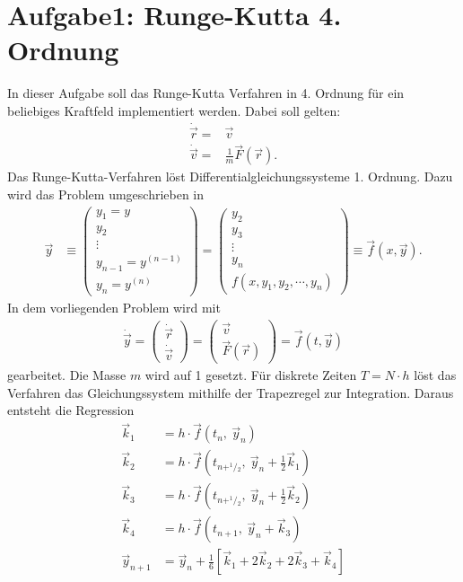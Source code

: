 
\section*{Aufgabe1: Runge-Kutta 4. Ordnung}
In dieser Aufgabe soll das Runge-Kutta Verfahren in 4. Ordnung
für ein beliebiges Kraftfeld implementiert werden.
Dabei soll gelten:
\begin{align}
	\dot{\vec{r}}=&\vec{v}\\
	\dot{\vec{v}}=&\frac{1}{m}\vec{F}(\vec{r}).
\end{align}
Das Runge-Kutta-Verfahren löst Differentialgleichungssysteme 1. Ordnung. Dazu wird das Problem umgeschrieben in
\begin{align}
	\vec{y}&\equiv
	\begin{pmatrix}
	y_1=y\\ y_2\\ \vdots\\y_{n-1}=y^{(n-1)}\\ y_n=y^{(n)}
	\end{pmatrix}=
	\begin{pmatrix}
		y_2\\y_3\\\vdots\\y_n\\f(x,y_1,y_2,\cdots,y_n)
	\end{pmatrix}
	\equiv\vec{f}(x,\vec{y}).
\end{align}
In dem vorliegenden Problem wird mit
\begin{align}
	\dot{\vec{y}}=\begin{pmatrix}
		\dot{\vec{r}}\\\dot{\vec{v}}
	\end{pmatrix}
	=
	\begin{pmatrix}
	\vec{v}\\\vec{F}(\vec{r})	
	\end{pmatrix}
	=\vec{f}(t,\vec{y})
\end{align}
gearbeitet.
Die Masse $m$ wird auf 1 gesetzt.
Für diskrete Zeiten $T= N\cdot h$ löst das Verfahren das Gleichungssystem mithilfe der Trapezregel zur Integration.
Daraus entsteht die Regression
\begin{align}
	\vec{k}_1&=h\cdot \vec{f}(t_n ,~\vec{y}_n)\\
	\vec{k}_2&=h\cdot \vec{f}\left(t_{n+^1\!/\!_2},~\vec{y}_n+\frac{1}{2}\vec{k}_1\right)\\
	\vec{k}_3&=h\cdot \vec{f}\left(t_{n+^1\!/\!_2},~\vec{y}_n+\frac{1}{2}\vec{k}_2\right)\\
	\vec{k}_4&=h\cdot \vec{f}\left(t_{n+1},~\vec{y}_n+\vec{k}_3\right)\\
	\vec{y}_{n+1}&=\vec{y}_n + \frac{1}{6}\left[ \vec{k}_1 + 2 \vec{k}_2 +2\vec{k}_3 +\vec{k}_4 \right]
\end{align} 
